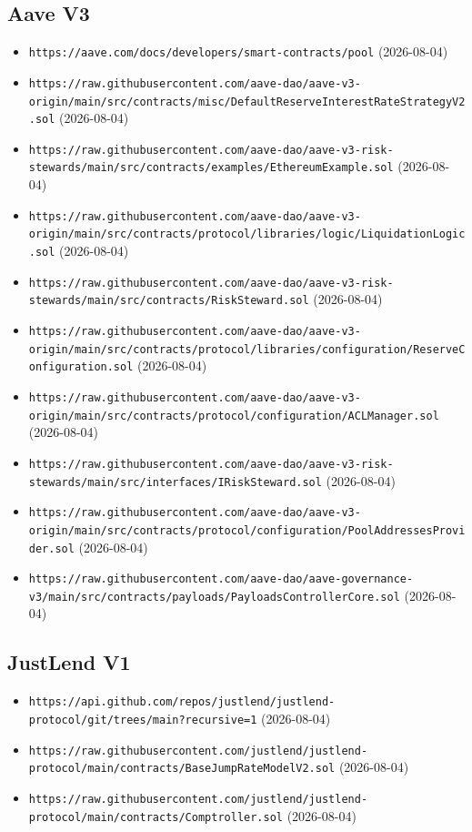 \subsection*{Aave V3}
\begin{itemize}\setlength{\itemsep}{0pt}\small
\item \texttt{https://aave.com/docs/developers/smart-contracts/pool} (2026-08-04)
\item \texttt{https://raw.githubusercontent.com/aave-dao/aave-v3-origin/main/src/contracts/misc/DefaultReserveInterestRateStrategyV2.sol} (2026-08-04)
\item \texttt{https://raw.githubusercontent.com/aave-dao/aave-v3-risk-stewards/main/src/contracts/examples/EthereumExample.sol} (2026-08-04)
\item \texttt{https://raw.githubusercontent.com/aave-dao/aave-v3-origin/main/src/contracts/protocol/libraries/logic/LiquidationLogic.sol} (2026-08-04)
\item \texttt{https://raw.githubusercontent.com/aave-dao/aave-v3-risk-stewards/main/src/contracts/RiskSteward.sol} (2026-08-04)
\item \texttt{https://raw.githubusercontent.com/aave-dao/aave-v3-origin/main/src/contracts/protocol/libraries/configuration/ReserveConfiguration.sol} (2026-08-04)
\item \texttt{https://raw.githubusercontent.com/aave-dao/aave-v3-origin/main/src/contracts/protocol/configuration/ACLManager.sol} (2026-08-04)
\item \texttt{https://raw.githubusercontent.com/aave-dao/aave-v3-risk-stewards/main/src/interfaces/IRiskSteward.sol} (2026-08-04)
\item \texttt{https://raw.githubusercontent.com/aave-dao/aave-v3-origin/main/src/contracts/protocol/configuration/PoolAddressesProvider.sol} (2026-08-04)
\item \texttt{https://raw.githubusercontent.com/aave-dao/aave-governance-v3/main/src/contracts/payloads/PayloadsControllerCore.sol} (2026-08-04)
\end{itemize}

\subsection*{JustLend V1}
\begin{itemize}\setlength{\itemsep}{0pt}\small
\item \texttt{https://api.github.com/repos/justlend/justlend-protocol/git/trees/main?recursive=1} (2026-08-04)
\item \texttt{https://raw.githubusercontent.com/justlend/justlend-protocol/main/contracts/BaseJumpRateModelV2.sol} (2026-08-04)
\item \texttt{https://raw.githubusercontent.com/justlend/justlend-protocol/main/contracts/Comptroller.sol} (2026-08-04)
\end{itemize}

